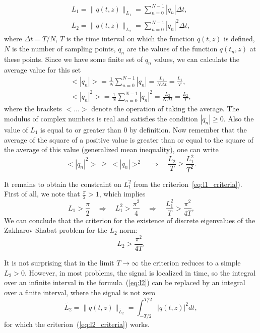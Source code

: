 \begin{eqnarray}
    L_1 = \| q(t,z) \|_{L_1} = \sum_{n = 0}^{N-1} | q_n | \Delta t {,} \\
    L_2 = \| q(t,z) \|_{L_2} = \sum_{n = 0}^{N-1} | q_n |^2 \Delta t {,}
\end{eqnarray}
where $ \Delta t = T / N $, $ T $ is the time interval on which the function $ q (t, z) $ is defined, $ N $ is the number of sampling points, $q_n$ are the values of the function $q (t_n , z)$ at these points. Since we have some finite set of $q_n$ values, we can calculate the average value for this set
\begin{eqnarray}
    < |q_n| > = \frac{1}{N} \sum_{n=0}^{N-1} |q_n| = \frac{L_1}{N \Delta t} = \frac{L_1}{T} {,} \\
    < |q_n|^2 > = \frac{1}{N} \sum_{n=0}^{N-1} |q_n|^2 = \frac{L_2}{N \Delta t} = \frac{L_2}{T} {,}
\end{eqnarray}
where the brackets $ <...> $ denote the operation of taking the average. The modulus of complex numbers is real and satisfies the condition $| q_n | \geq 0$. Also the value of $L_1$ is equal to or greater than $0$ by definition. Now remember that the average of the square of a positive value is greater than or equal to the square of the average of this value (generalized mean inequality), one can write
\begin{equation}
    < |q_n|^2 > \ \geq \ < |q_n| >^2 \quad \Rightarrow \quad \frac{L_2}{T} \geq \frac{L_1^2}{T^2} {.}
\end{equation}

It remains to obtain the constraint on $L_1^2$ from the criterion~\ref{eq:l1_criteria}).
First of all, we note that $ \frac{\pi}{2}> 1 $, which implies
\begin{equation}
    L_1 > \frac{\pi}{2} \quad \Rightarrow \quad L_1^2 > \frac{\pi^2}{4} \quad \Rightarrow \quad \frac{L_1^2}{T} > \frac{\pi^2}{4T} {.}
\end{equation}
We can conclude that the criterion for the existence of discrete eigenvalues of the Zakharov-Shabat problem for the $ L_2 $ norm:
\begin{equation}
    L_2 > \frac{\pi^2}{4T} {.}
    \label{eq:l2_criteria}
\end{equation}

It is not surprising that in the limit $ T \to \infty $ the criterion reduces to a simple $ L_2> 0 $. However, in most problems, the signal is localized in time, so the integral over an infinite interval in the formula~(\ref{eq:l2}) can be replaced by an integral over a finite interval, where the signal is not zero
\begin{equation}
    \widetilde{L_2} = \| q(t,z) \|_{\widetilde{L_2}} = \int_{-T/2}^{T/2} |q(t,z)|^2 dt {,}
\end{equation}
for which the criterion~(\ref{eq:l2_criteria}) works.